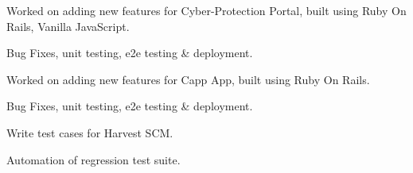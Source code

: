 \documentclass[]{my-resume-openfont}
\begin{document}
\begin{minipage}[t]{0.66\textwidth}
\begin{tightemize}
\item{Worked on adding new features for Cyber-Protection Portal, built using Ruby On Rails, Vanilla JavaScript.}
\item{Bug Fixes, unit testing, e2e testing \& deployment.}
\end{tightemize}
\sectionsep

\begin{tightemize}
\item{Worked on adding new features for Capp App, built using Ruby On Rails.}
\item{Bug Fixes, unit testing, e2e testing \& deployment.}
\end{tightemize}
\sectionsep

\begin{tightemize}
\item{Write test cases for Harvest SCM.}
\item{Automation of regression test suite.}
\end{tightemize}
\sectionsep

\end{minipage} 
\end{document}
